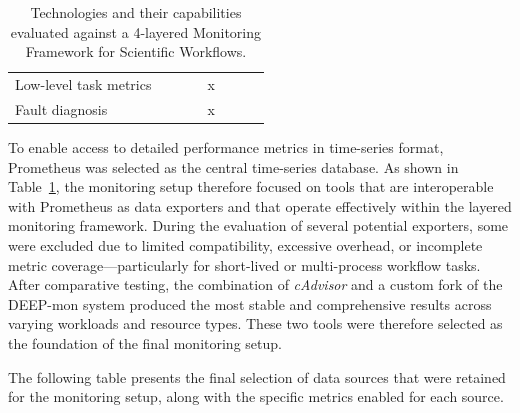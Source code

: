 \begin{table}[htbp]
{\begin{tabular}{lccccccc}
            Low-level task metrics              &                   &                               &                          & x                   &                         &                           &                           \\
            Fault diagnosis                     &                   &                               &                          & x                   &                         &                           &                           \\
            \bottomrule
        \end{tabular}
    }
    \caption{Technologies and their capabilities evaluated against a 4-layered Monitoring Framework for Scientific Workflows.}
    \label{tab:monitoring-features}
\end{table}

To enable access to detailed performance metrics in time-series format, Prometheus was selected as the central time-series database. As shown in Table~\ref{tab:monitoring-features}, the monitoring setup therefore focused on tools that are interoperable with Prometheus as data exporters and that operate effectively within the layered monitoring framework.
During the evaluation of several potential exporters, some were excluded due to limited compatibility, excessive overhead, or incomplete metric coverage—particularly for short-lived or multi-process workflow tasks. After comparative testing, the combination of \textit{cAdvisor} and a custom fork of the DEEP-mon system \cite{8425477} produced the most stable and comprehensive results across varying workloads and resource types. These two tools were therefore selected as the foundation of the final monitoring setup.

The following table presents the final selection of data sources that were retained for the monitoring setup, along with the specific metrics enabled for each source.

